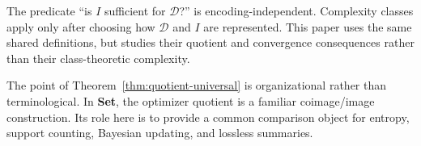\begin{remark}\label{rem:question-vs-problem}
The predicate ``is $I$ sufficient for $\mathcal{D}$?'' is encoding-independent. Complexity classes apply only after choosing how $\mathcal{D}$ and $I$ are represented. This paper uses the same shared definitions, but studies their quotient and convergence consequences rather than their class-theoretic complexity.
\end{remark}

The point of Theorem~\ref{thm:quotient-universal} is organizational rather than terminological. In \textbf{Set}, the optimizer quotient is a familiar coimage/image construction. Its role here is to provide a common comparison object for entropy, support counting, Bayesian updating, and lossless summaries.
